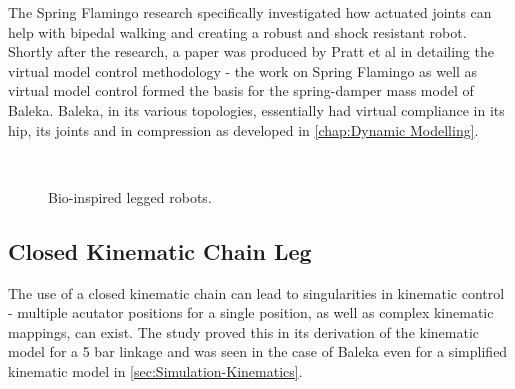 The Spring Flamingo research specifically investigated how actuated joints can help with bipedal walking and creating a robust and shock resistant robot.\cite{Pratt1998} Shortly after the research, a paper was produced by Pratt et al in \cite{Pratt2001} detailing the virtual model control methodology - the work on Spring Flamingo as well as virtual model control formed the basis for the spring-damper mass model of Baleka. Baleka, in its various topologies, essentially had virtual compliance in its hip, its joints and in compression as developed in \cref{chap:Dynamic Modelling}.

\begin{figure}
\centering
{}
~
\caption{Bio-inspired legged robots.}
\label{fig:bioinspired-legged-robots}
\end{figure}

\subsection{Closed Kinematic Chain Leg}

The use of a closed kinematic chain can lead to singularities in kinematic control - multiple acutator positions for a single position, as well as complex kinematic mappings, can exist. The study \cite{Yu2006} proved this in its derivation of the kinematic model for a 5 bar linkage and was seen in the case of Baleka even for a simplified kinematic model in \cref{sec:Simulation-Kinematics}. 

